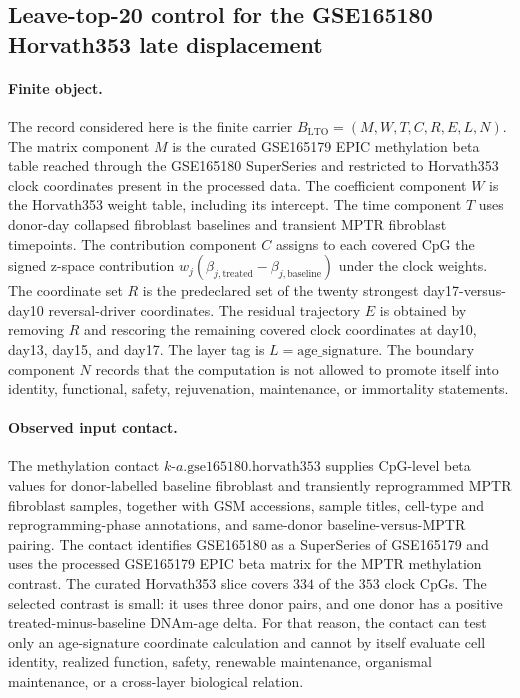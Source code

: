 \subsection{Leave-top-20 control for the GSE165180 Horvath353 late displacement}\label{sec:age-clock-shift-reversal-leave-top20-out-gse165180}

\paragraph{Finite object.}
The record considered here is the finite carrier $B_{\mathrm{LTO}}=(M,W,T,C,R,E,L,N)$.  The matrix component $M$ is the curated GSE165179 EPIC methylation beta table reached through the GSE165180 SuperSeries and restricted to Horvath353 clock coordinates present in the processed data.  The coefficient component $W$ is the Horvath353 weight table, including its intercept.  The time component $T$ uses donor-day collapsed fibroblast baselines and transient MPTR fibroblast timepoints.  The contribution component $C$ assigns to each covered CpG the signed z-space contribution $w_j(\beta_{j,\mathrm{treated}}-\beta_{j,\mathrm{baseline}})$ under the clock weights.  The coordinate set $R$ is the predeclared set of the twenty strongest day17-versus-day10 reversal-driver coordinates.  The residual trajectory $E$ is obtained by removing $R$ and rescoring the remaining covered clock coordinates at day10, day13, day15, and day17.  The layer tag is $L=\mathrm{age\_signature}$.  The boundary component $N$ records that the computation is not allowed to promote itself into identity, functional, safety, rejuvenation, maintenance, or immortality statements.

\paragraph{Observed input contact.}
The methylation contact $k\mbox{-}a.\mathrm{gse165180.horvath353}$ supplies CpG-level beta values for donor-labelled baseline fibroblast and transiently reprogrammed MPTR fibroblast samples, together with GSM accessions, sample titles, cell-type and reprogramming-phase annotations, and same-donor baseline-versus-MPTR pairing.  The contact identifies GSE165180 as a SuperSeries of GSE165179 and uses the processed GSE165179 EPIC beta matrix for the MPTR methylation contrast.  The curated Horvath353 slice covers $334$ of the $353$ clock CpGs.  The selected contrast is small: it uses three donor pairs, and one donor has a positive treated-minus-baseline DNAm-age delta.  For that reason, the contact can test only an age-signature coordinate calculation and cannot by itself evaluate cell identity, realized function, safety, renewable maintenance, organismal maintenance, or a cross-layer biological relation.

